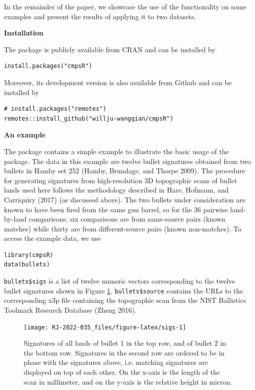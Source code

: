 In the remainder of the paper, we showcase the use of the  functionality on some examples and present the results of applying it to two datasets.

\textbf{Installation}

The  package is publicly available from CRAN and can be installed by

\begin{verbatim}
install.packages("cmpsR")
\end{verbatim}

Moreover, its development version is also available from Github and can be installed by

\begin{verbatim}
# install.packages("remotes")
remotes::install_github("willju-wangqian/cmpsR")
\end{verbatim}

\textbf{An example}

The  package contains a simple example to illustrate the basic usage of the package.
The data in this example are twelve bullet signatures obtained from two bullets in Hamby set 252 (Hamby, Brundage, and Thorpe 2009).
The procedure for generating signatures from high-resolution 3D topographic scans of bullet lands used here follows the methodology described in Hare, Hofmann, and Carriquiry (2017) (as discussed above).
The two bullets under consideration are known to have been fired from the same gun barrel, so for the 36 pairwise land-by-land comparisons, six comparisons are from same-source pairs (known matches) while thirty are from different-source pairs (known non-matches).
To access the example data, we use

\begin{verbatim}
library(cmpsR)
data(bullets)
\end{verbatim}

\texttt{bullets\$sigs} is a list of twelve numeric vectors corresponding to the twelve bullet signatures shown in Figure \ref{fig:sigs}.
\texttt{bullets\$source} contains the URLs to the corresponding x3p file containing the topographic scan from the NIST Ballistics Toolmark Research Database (Zheng 2016).

\begin{figure}

{\centering \texttt{[image: RJ-2022-035\_files/figure-latex/sigs-1]} 

}

\caption{Signatures of all lands of bullet 1 in the top row, and of bullet 2 in the bottom row. Signatures in the second row are ordered to be in phase with the signatures above, i.e. matching signatures are displayed on top of each other. On the x-axis is the length of the scan in millimeter, and on the y-axis is the relative height in micron.}\label{fig:sigs}
\end{figure}

